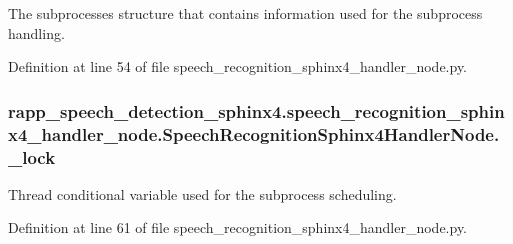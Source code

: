 The subprocesses structure that contains information used for the subprocess handling. 



Definition at line 54 of file speech\-\_\-recognition\-\_\-sphinx4\-\_\-handler\-\_\-node.\-py.

\hypertarget{classrapp__speech__detection__sphinx4_1_1speech__recognition__sphinx4__handler__node_1_1SpeechRecognitionSphinx4HandlerNode_a26891ed7d1142f5f72cf81c7ff98d8d2}{
\subsubsection[{\-\_\-lock}]{\setlength{\rightskip}{0pt plus 5cm}rapp\-\_\-speech\-\_\-detection\-\_\-sphinx4.\-speech\-\_\-recognition\-\_\-sphinx4\-\_\-handler\-\_\-node.\-Speech\-Recognition\-Sphinx4\-Handler\-Node.\-\_\-lock\hspace{0.3cm}{\ttfamily [private]}}}\label{classrapp__speech__detection__sphinx4_1_1speech__recognition__sphinx4__handler__node_1_1SpeechRecognitionSphinx4HandlerNode_a26891ed7d1142f5f72cf81c7ff98d8d2}


Thread conditional variable used for the subprocess scheduling. 



Definition at line 61 of file speech\-\_\-recognition\-\_\-sphinx4\-\_\-handler\-\_\-node.\-py.

